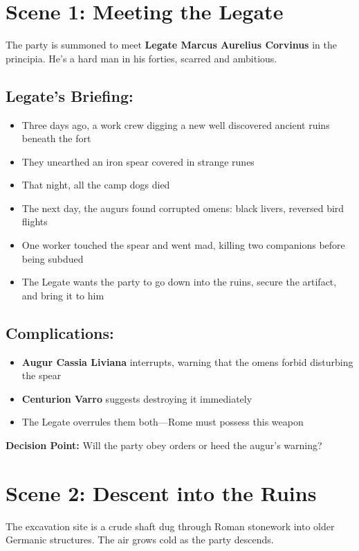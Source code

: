 \documentclass[letterpaper,oneside,twocolumn,openany]{dndbook}
\begin{document}
\section{Scene 1: Meeting the Legate}

The party is summoned to meet \textbf{Legate Marcus Aurelius Corvinus} in the principia. He's a hard man in his forties, scarred and ambitious.

\subsection{Legate's Briefing:}
\begin{itemize}
\item Three days ago, a work crew digging a new well discovered ancient ruins beneath the fort
\item They unearthed an iron spear covered in strange runes
\item That night, all the camp dogs died
\item The next day, the augurs found corrupted omens: black livers, reversed bird flights
\item One worker touched the spear and went mad, killing two companions before being subdued
\item The Legate wants the party to go down into the ruins, secure the artifact, and bring it to him
\end{itemize}

\subsection{Complications:}
\begin{itemize}
\item \textbf{Augur Cassia Liviana} interrupts, warning that the omens forbid disturbing the spear
\item \textbf{Centurion Varro} suggests destroying it immediately
\item The Legate overrules them both—Rome must possess this weapon
\end{itemize}

\textbf{Decision Point:} Will the party obey orders or heed the augur's warning?

\section{Scene 2: Descent into the Ruins}

The excavation site is a crude shaft dug through Roman stonework into older Germanic structures. The air grows cold as the party descends.
\end{document}
